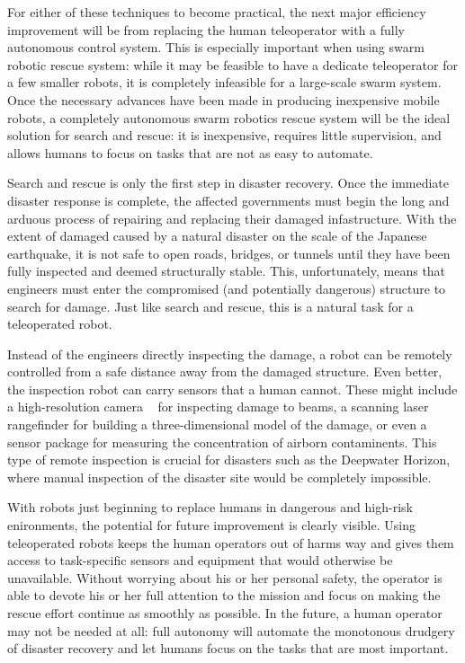 \documentclass[twocolumn,11pt]{article}
\begin{document}
For either of these techniques to become practical, the next major efficiency
improvement will be from replacing the human teleoperator with a fully
autonomous control system. This is especially important when using swarm
robotic rescue system: while it may be feasible to have a dedicate teleoperator
for a few smaller robots, it is completely infeasible for a large-scale swarm
system. Once the necessary advances have been made in producing inexpensive
mobile robots, a completely autonomous swarm robotics rescue system will be the
ideal solution for search and rescue: it is inexpensive, requires little
supervision, and allows humans to focus on tasks that are not as easy to
automate.

Search and rescue is only the first step in disaster recovery. Once the
immediate disaster response is complete, the affected governments must begin
the long and arduous process of repairing and replacing their damaged
infastructure. With the extent of damaged caused by a natural disaster on the
scale of the Japanese earthquake, it is not safe to open roads, bridges, or
tunnels until they have been fully inspected and deemed structurally stable.
This, unfortunately, means that engineers must enter the compromised (and
potentially dangerous) structure to search for damage. Just like search and
rescue, this is a natural task for a teleoperated robot.

Instead of the engineers directly inspecting the damage, a robot can be
remotely controlled from a safe distance away from the damaged structure. Even
better, the inspection robot can carry sensors that a human cannot. These might
include a high-resolution camera ~\cite{gym} for inspecting damage to beams, a
scanning laser rangefinder for building a three-dimensional model of the
damage, or even a sensor package for measuring the concentration of airborn
contaminents. This type of remote inspection is crucial for disasters such as
the Deepwater Horizon, where manual inspection of the disaster site would be
completely impossible.

With robots just beginning to replace humans in dangerous and high-risk
enironments, the potential for future improvement is clearly visible. Using
teleoperated robots keeps the human operators out of harms way and gives them
access to task-specific sensors and equipment that would otherwise be
unavailable. Without worrying about his or her personal safety, the operator is
able to devote his or her full attention to the mission and focus on making the
rescue effort continue as smoothly as possible. In the future, a human operator
may not be needed at all: full autonomy will automate the monotonous drudgery
of disaster recovery and let humans focus on the tasks that are most important.
\end{document}
